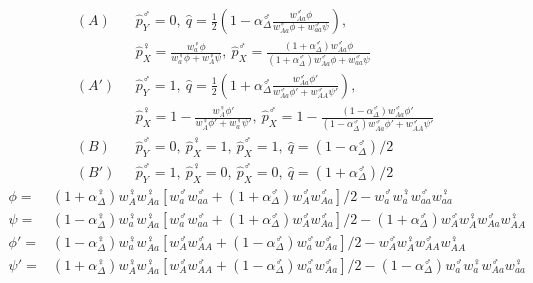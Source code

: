 \documentclass[12pt]{article}
\begin{document}
\begin{subequations}\label{eq:tightequil}
\begin{align}
(A)\ \ \ &\hat{p}_{Y}^{\male}=0,
\ \hat{q}=\frac{1}{2}\left(1 - \alpha_\Delta^\male \frac{ w_{Aa}^{\male} \phi}{w_{Aa}^{\male} \phi+ w_{aa}^{\male} \psi}\right),\\
&\hat{p}_{X}^{\female}=\frac{w_{a}^{\female} \phi}{w_{a}^{\female} \phi+ w_{A}^{\female} \psi},
\ \hat{p}_{X}^{\male}=\frac{(1+\alpha_\Delta^\male)w_{Aa}^{\male} \phi}{(1+\alpha_\Delta^\male)w_{Aa}^{\male} \phi +w_{aa}^{\male} \psi} \nonumber \\
(A')\ \ \ &\hat{p}_{Y}^{\male}=1,
\ \hat{q}=\frac{1}{2}\left(1 + \alpha_\Delta^\male \frac{w_{Aa}^{\male} \phi'}{w_{Aa}^{\male} \phi' + w_{AA}^{\male} \psi'}\right),\\
&\hat{p}_{X}^{\female}=1-\frac{w_{A}^{\female} \phi'}{w_{A}^{\female} \phi'+ w_{a}^{\female} \psi'},
\ \hat{p}_{X}^{\male}=1-\frac{(1-\alpha_\Delta^\male)w_{Aa}^{\male} \phi'}{(1-\alpha_\Delta^\male)w_{Aa}^{\male} \phi'+w_{AA}^{\male} \psi'} \nonumber \\
(B)\ \ \ &\hat{p}_{Y}^{\male}=0,\ \hat{p}_{X}^{\female}=1,\ \hat{p}_{X}^{\male}=1, \ \hat{q}=(1 -\alpha^\male_\Delta)/2\\
(B')\ \ \ &\hat{p}_{Y}^{\male}=1,\ \hat{p}_{X}^{\female}=0,\ \hat{p}_{X}^{\male}=0, \ \hat{q}=(1+\alpha^\male_\Delta)/2
\end{align}
\end{subequations}
\begin{equation*}
\begin{split}
\phi=&(1+\alpha^\female_\Delta) w_{A}^{\female} w_{Aa}^{\female} \left[ w_{a}^{\male} w_{aa}^{\male} + (1+\alpha_\Delta^\male) w_{A}^{\male} w_{Aa}^{\male} \right]/2 - w_{a}^{\male} w_{a}^{\female} w_{aa}^{\male} w_{aa}^{\female} \\
\psi=&(1-\alpha^\female_\Delta) w_{a}^{\female} w_{Aa}^{\female} \left[ w_{a}^{\male} w_{aa}^{\male} + (1+\alpha_\Delta^\male) w_{A}^{\male} w_{Aa}^{\male}\right]/2 - (1+\alpha_\Delta^\male) w_{A}^{\male} w_{A}^{\female} w_{Aa}^{\male} w_{AA}^{\female}\\
\phi'=&(1-\alpha^\female_\Delta) w_{a}^{\female} w_{Aa}^{\female} \left[ w_{A}^{\male} w_{AA}^{\male} + (1-\alpha_\Delta^\male) w_{a}^{\male} w_{Aa}^{\male} \right]/2 - w_{A}^{\male} w_{A}^{\female} w_{AA}^{\male} w_{AA}^{\female}\\
\psi'=&(1+\alpha^\female_\Delta) w_{A}^{\female} w_{Aa}^{\female} \left[ w_{A}^{\male} w_{AA}^{\male} + (1-\alpha_\Delta^\male) w_{a}^{\male} w_{Aa}^{\male} \right]/2 - (1-\alpha_\Delta^\male) w_{a}^{\male} w_{a}^{\female} w_{Aa}^{\male} w_{aa}^{\female}
\end{split}
\end{equation*}
\end{document}
